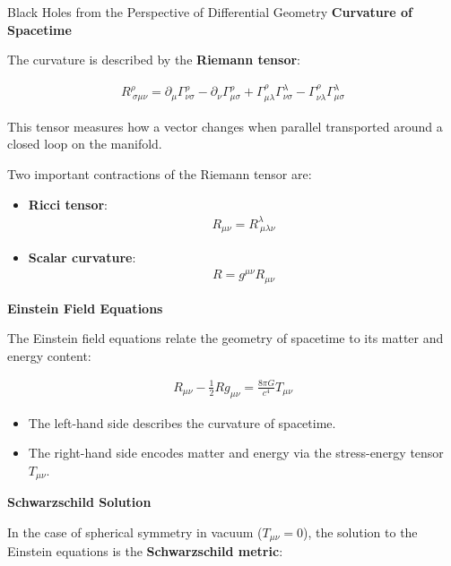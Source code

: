 \documentclass[final]{beamer}
\newlength{\colwidth}
\begin{document}
\begin{frame}[t]
\begin{columns}[t]
\begin{column}{\colwidth}
\begin{block}{Black Holes from the Perspective of Differential Geometry}
    \textbf{\large Curvature of Spacetime}
      
      The curvature is described by the \textbf{Riemann tensor}:
      
      \begin{align*}
      R^\rho_{\ \sigma\mu\nu} = \partial_\mu \Gamma^\rho_{\nu\sigma} - \partial_\nu \Gamma^\rho_{\mu\sigma} + \Gamma^\rho_{\mu\lambda} \Gamma^\lambda_{\nu\sigma} - \Gamma^\rho_{\nu\lambda} \Gamma^\lambda_{\mu\sigma}
      \end{align*}
      
      This tensor measures how a vector changes when parallel transported around a closed loop on the manifold.
      
      Two important contractions of the Riemann tensor are:
      
      \begin{itemize}
        \item \textbf{Ricci tensor}:
        \begin{align*}
        R_{\mu\nu} = R^\lambda_{\ \mu\lambda\nu}
        \end{align*}
        \item \textbf{Scalar curvature}:
        \begin{align*}
        R = g^{\mu\nu} R_{\mu\nu}
        \end{align*}
      \end{itemize}
      
      \textbf{\large Einstein Field Equations}
      
      The Einstein field equations relate the geometry of spacetime to its matter and energy content:
      
      \begin{align*}
      R_{\mu\nu} - \frac{1}{2} R g_{\mu\nu} = \frac{8\pi G}{c^4} T_{\mu\nu}
      \end{align*}
      
      \begin{itemize}
        \item The left-hand side describes the curvature of spacetime.
        \item The right-hand side encodes matter and energy via the stress-energy tensor \(T_{\mu\nu}\).
      \end{itemize}
      
      \textbf{\large Schwarzschild Solution}
      
      In the case of spherical symmetry in vacuum (\(T_{\mu\nu} = 0\)), the solution to the Einstein equations is the \textbf{Schwarzschild metric}:
      

\end{block}
\end{column}
\end{columns}
\end{frame}
\end{document}
